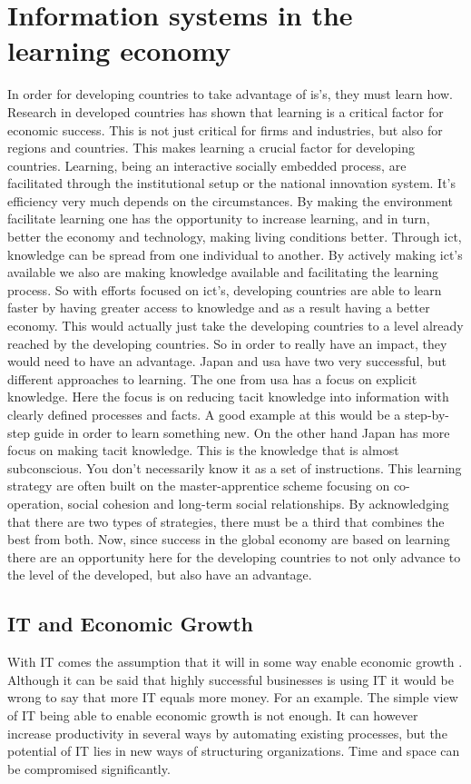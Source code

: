 
\section{Information systems in the learning economy}
\label{infolearnec}
In order for developing countries to take advantage of \gls{is}'s, they must learn how.
Research in developed countries has shown that learning is a critical factor for economic success.
This is not just critical for firms and industries, but also for regions and countries.
This makes learning a crucial factor for developing countries. 
Learning, being an interactive socially embedded process, are facilitated through the institutional setup or the national innovation system. It's efficiency very much depends on the circumstances.
By making the environment facilitate learning one has the opportunity to increase learning, and in turn, better the economy and technology, making living conditions better. 
Through \gls{ict}, knowledge can be spread from one individual to another. 
By actively making \gls{ict}'s available we also are making knowledge available and facilitating the learning process. 
So with efforts focused on \gls{ict}'s, developing countries are able to learn faster by having greater access to knowledge and as a result having a better economy.
This would actually just take the developing countries to a level already reached by the developing countries. So in order to really have an impact, they would need to have an advantage. 
Japan and \gls{usa} have two very successful, but different approaches to learning. 
The one from \gls{usa} has a focus on explicit knowledge. Here the focus is on reducing tacit knowledge into information with clearly defined processes and facts. A good example at this would be a step-by-step guide in order to learn something new. 
On the other hand Japan has more focus on making tacit knowledge. This is the knowledge that is almost subconscious. You don't necessarily know it as a set of instructions. This learning strategy are often built on the master-apprentice scheme focusing on co-operation, social cohesion and long-term social relationships. 
By acknowledging that there are two types of strategies, there must be a third that combines the best from both. 
Now, since success in the global economy are based on learning there are an opportunity here for the developing countries to not only advance to the level of the developed, but also have an advantage. 

\cite{gedi:erik}


\subsection{IT and Economic Growth}
With IT comes the assumption that it will in some way enable economic growth \cite{ca:ieeg}.
Although it can be said that highly successful businesses is using IT it would be wrong to say that more IT equals more money.
For an example.
The simple view of IT being able to enable economic growth is not enough.
It can however increase productivity in several ways by automating existing processes, but the potential of IT lies in new ways of structuring organizations.
Time and space can be compromised significantly.


